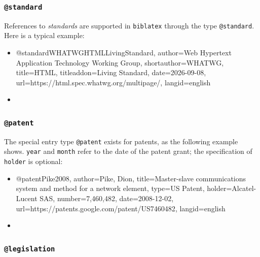 
\subsubsection{\texttt{\bfseries @standard}}
\label{sec:@standard}

References to \emph{standards} are supported in \texttt{biblatex} through the
type \texttt{@standard}. Here is a typical example:
%
\begin{itemize}
\item[]
\begin{GenericCode}[numbers=none]
@standard{WHATWGHTMLLivingStandard,
  author={{Web Hypertext Application Technology Working Group}},
  shortauthor={WHATWG},
  title={HTML},
  titleaddon={Living Standard},
  date={2026-09-08},
  url={https://html.spec.whatwg.org/multipage/},
  langid={english}
}
\end{GenericCode}
\item[\cite{WHATWGHTMLLivingStandard}] 
\end{itemize}
%


\subsubsection{\texttt{\bfseries @patent}}
\label{sec:@patent}

The special entry type \texttt{@patent} exists for patents, as the following
example shows. \texttt{year} and \texttt{month} refer to the date of the patent
grant; the specification of \texttt{holder} is optional:
%
\begin{itemize}
\item[]
\begin{GenericCode}[numbers=none]
@patent{Pike2008,
  author={Pike, Dion},
  title={Master-slave communications system and method for a network element},
  type={US Patent},
  holder={Alcatel-Lucent SAS},
  number={7,460,482},
  date={2008-12-02},
  url={https://patents.google.com/patent/US7460482},
  langid={english}
}
\end{GenericCode}
\item[\cite{Pike2008}] 
\end{itemize}
%


\subsubsection{\texttt{\bfseries @legislation}}
\label{sec:@legislation}

